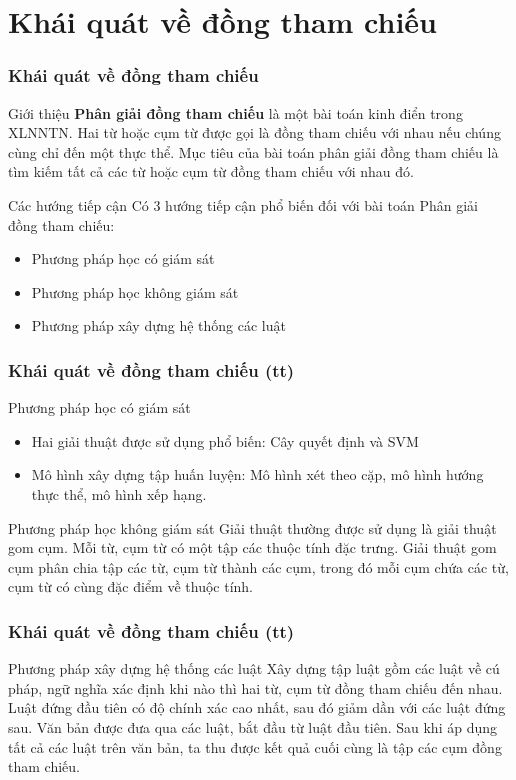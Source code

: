 \documentclass{beamer}
\begin{document}
	\section{Khái quát về đồng tham chiếu}
	\begin{frame}
		\frametitle{Khái quát về đồng tham chiếu}
		\begin{block}{Giới thiệu}
			\textbf{Phân giải đồng tham chiếu} là một bài toán kinh điển trong XLNNTN. Hai từ hoặc cụm từ được gọi là đồng tham chiếu với nhau nếu chúng cùng chỉ đến một thực thể.
			Mục tiêu của bài toán phân giải đồng tham chiếu là tìm kiếm tất cả các từ hoặc cụm từ đồng tham chiếu với nhau đó.
		\end{block}
		\begin{block}{Các hướng tiếp cận}
			Có 3 hướng tiếp cận phổ biến đối với bài toán Phân giải đồng tham chiếu:
			\begin{itemize}
				\item Phương pháp học có giám sát
				\item Phương pháp học không giám sát
				\item Phương pháp xây dựng hệ thống các luật
			\end{itemize}
		\end{block}
	\end{frame}

	\begin{frame}
		\frametitle{Khái quát về đồng tham chiếu (tt)}
		\begin{block}{Phương pháp học có giám sát}		
		\begin{itemize}
			\item Hai giải thuật được sử dụng phổ biến: Cây quyết định và SVM
			\item Mô hình xây dựng tập huấn luyện: Mô hình xét theo cặp, mô hình hướng thực thể, mô hình xếp hạng.
		\end{itemize}
		\end{block}
		\begin{block}{Phương pháp học không giám sát}
			Giải thuật thường được sử dụng là giải thuật gom cụm. Mỗi từ, cụm từ có một tập các thuộc tính đặc trưng. Giải thuật gom cụm phân chia tập các từ, cụm từ thành các cụm, trong đó mỗi cụm chứa các từ, cụm từ có cùng đặc điểm về thuộc tính.
		\end{block}
	\end{frame}

	\begin{frame}
		\frametitle{Khái quát về đồng tham chiếu (tt)}
		\begin{block}{Phương pháp xây dựng hệ thống các luật}
			Xây dựng tập luật gồm các luật về cú pháp, ngữ nghĩa xác định khi nào thì hai từ, cụm từ đồng tham chiếu đến nhau. Luật đứng đầu tiên có độ chính xác cao nhất, sau đó giảm dần với các luật đứng sau. Văn bản được đưa qua các luật, bắt đầu từ luật đầu tiên. Sau khi áp dụng tất cả các luật trên văn bản, ta thu được kết quả cuối cùng là tập các cụm đồng tham chiếu.
		\end{block}
	\end{frame}
\end{document}
